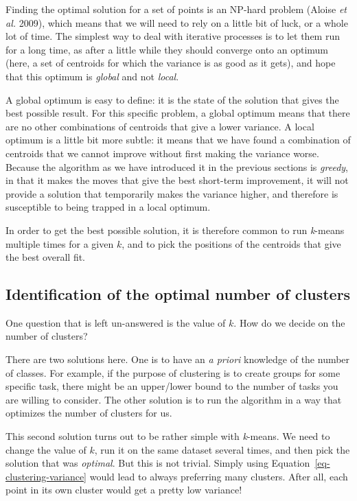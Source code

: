 \documentclass[
  letterpaper,
]{scrbook}
\begin{document}
Finding the optimal solution for a set of points is an NP-hard problem
(Aloise \emph{et al.} 2009), which means that we will need to rely on a
little bit of luck, or a whole lot of time. The simplest way to deal
with iterative processes is to let them run for a long time, as after a
little while they should converge onto an optimum (here, a set of
centroids for which the variance is as good as it gets), and hope that
this optimum is \emph{global} and not \emph{local}.

A global optimum is easy to define: it is the state of the solution that
gives the best possible result. For this specific problem, a global
optimum means that there are no other combinations of centroids that
give a lower variance. A local optimum is a little bit more subtle: it
means that we have found a combination of centroids that we cannot
improve without first making the variance worse. Because the algorithm
as we have introduced it in the previous sections is \emph{greedy}, in
that it makes the moves that give the best short-term improvement, it
will not provide a solution that temporarily makes the variance higher,
and therefore is susceptible to being trapped in a local optimum.

In order to get the best possible solution, it is therefore common to
run \emph{k}-means multiple times for a given \(k\), and to pick the
positions of the centroids that give the best overall fit.

\subsection{Identification of the optimal number of
clusters}\label{sec-clustering-optimality}

One question that is left un-answered is the value of \(k\). How do we
decide on the number of clusters?

There are two solutions here. One is to have an \emph{a priori}
knowledge of the number of classes. For example, if the purpose of
clustering is to create groups for some specific task, there might be an
upper/lower bound to the number of tasks you are willing to consider.
The other solution is to run the algorithm in a way that optimizes the
number of clusters for us.

This second solution turns out to be rather simple with \emph{k}-means.
We need to change the value of \(k\), run it on the same dataset several
times, and then pick the solution that was \emph{optimal}. But this is
not trivial. Simply using Equation~\ref{eq-clustering-variance} would
lead to always preferring many clusters. After all, each point in its
own cluster would get a pretty low variance!
\end{document}
